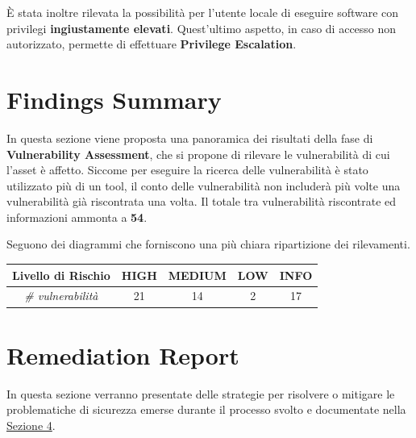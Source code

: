 \documentclass[a4paper, 12pt, oneside]{article}
\begin{document}
È stata inoltre rilevata la possibilità per l'utente locale di eseguire software con privilegi \textbf{ingiustamente elevati}. Quest'ultimo aspetto, in caso di accesso non autorizzato, permette di effettuare \textbf{Privilege Escalation}.

\newpage
\section{Findings Summary}
In questa sezione viene proposta una panoramica dei risultati della fase di \textbf{Vulnerability Assessment}, che si propone di rilevare le vulnerabilità di cui l'asset è affetto. Siccome per eseguire la ricerca delle vulnerabilità è stato utilizzato più di un tool, il conto delle vulnerabilità non includerà più volte una vulnerabilità già riscontrata una volta. Il totale tra vulnerabilità riscontrate ed informazioni ammonta a \textbf{54}.

Seguono dei diagrammi che forniscono una più chiara ripartizione dei rilevamenti.

\vspace{15mm}
    \begin{table}[h!]
        \centering
        \begin{tabular}{|l|l|l|l|l|}
            \hline
            Livello di Rischio                              & \cellcolor[HTML]{FE0000}HIGH & \cellcolor[HTML]{FFCC67}MEDIUM & \cellcolor[HTML]{34FF34}LOW & \cellcolor[HTML]{34CDF9}INFO \\ \hline
            \multicolumn{1}{|c|}{\textit{\# vulnerabilità}} & \multicolumn{1}{c|}{21}      & \multicolumn{1}{c|}{14}        & \multicolumn{1}{c|}{2}      & \multicolumn{1}{c|}{17}      \\ \hline
        \end{tabular}
    \end{table}
    \vspace{15mm}
    \begin{center}
    \end{center}
        
\newpage

\section{Remediation Report}
In questa sezione verranno presentate delle strategie per risolvere o mitigare le problematiche di sicurezza emerse durante il processo svolto e documentate nella \hyperref[sec:vulnrep]{Sezione 4}.
\end{document}
